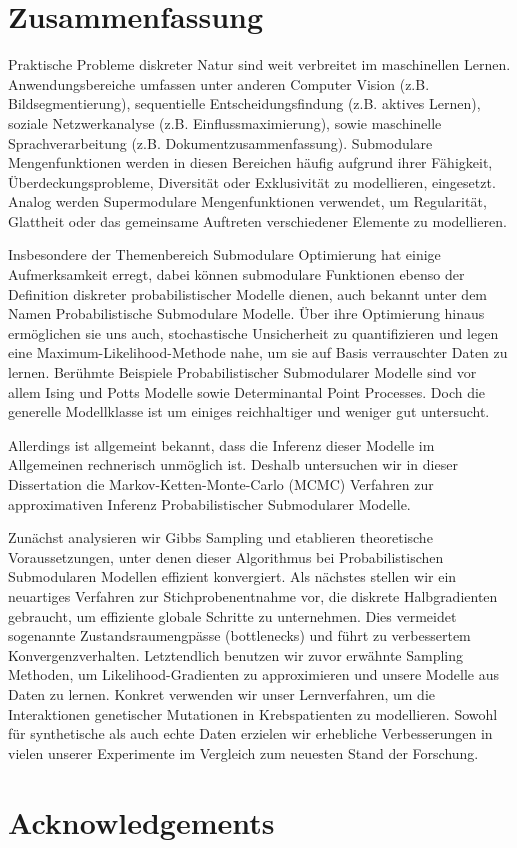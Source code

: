 \cleardoublepage
\section*{\centering Zusammenfassung}
\vspace{1em}
Praktische Probleme diskreter Natur sind weit verbreitet im maschinellen Lernen.
Anwendungsbereiche umfassen unter anderen Computer Vision (z.B. Bildsegmentierung), sequentielle Entscheidungsfindung (z.B. aktives Lernen), soziale Netzwerkanalyse (z.B. Einflussmaximierung), sowie maschinelle Sprachverarbeitung (z.B. Dokumentzusammenfassung).
Submodulare Mengenfunktionen werden in diesen Bereichen häufig aufgrund ihrer Fähigkeit, Überdeckungsprobleme, Diversität oder Exklusivität zu modellieren, eingesetzt.
Analog werden Supermodulare Mengenfunktionen verwendet, um Regularität, Glattheit oder das gemeinsame Auftreten verschiedener Elemente zu modellieren.

Insbesondere der Themenbereich Submodulare Optimierung hat einige Aufmerksamkeit erregt, dabei können submodulare Funktionen ebenso der Definition diskreter probabilistischer Modelle dienen, auch bekannt unter dem Namen Probabilistische Submodulare Modelle.
Über ihre Optimierung hinaus ermöglichen sie uns auch, stochastische Unsicherheit zu quantifizieren und legen eine Maximum-Likelihood-Methode nahe, um sie auf Basis verrauschter Daten zu lernen.
Berühmte Beispiele Probabilistischer Submodularer Modelle sind vor allem Ising und Potts Modelle sowie Determinantal Point Processes.
Doch die generelle Modellklasse ist um einiges reichhaltiger und weniger gut untersucht. 

Allerdings ist allgemeint bekannt, dass die Inferenz dieser Modelle im Allgemeinen rechnerisch unmöglich ist.
Deshalb untersuchen wir in dieser Dissertation die Markov-Ketten-Monte-Carlo (MCMC) Verfahren zur approximativen Inferenz Probabilistischer Submodularer Modelle.

Zunächst analysieren wir Gibbs Sampling und etablieren theoretische Voraussetzungen, unter denen dieser Algorithmus bei Probabilistischen Submodularen Modellen effizient konvergiert.
Als nächstes stellen wir ein neuartiges Verfahren zur Stichprobenentnahme vor, die diskrete Halbgradienten gebraucht, um effiziente globale Schritte zu unternehmen.
Dies vermeidet sogenannte Zustandsraumengpässe (bottlenecks) und führt zu verbessertem Konvergenzverhalten.
Letztendlich benutzen wir zuvor erwähnte Sampling Methoden, um Likelihood-Gradienten zu approximieren und unsere Modelle aus Daten zu lernen.
Konkret verwenden wir unser Lernverfahren, um die Interaktionen genetischer Mutationen in Krebspatienten zu modellieren.
Sowohl für synthetische als auch echte Daten erzielen wir erhebliche Verbesserungen in vielen unserer Experimente im Vergleich zum neuesten Stand der Forschung.


\cleardoublepage
\section*{\centering Acknowledgements}
\vspace{1em}